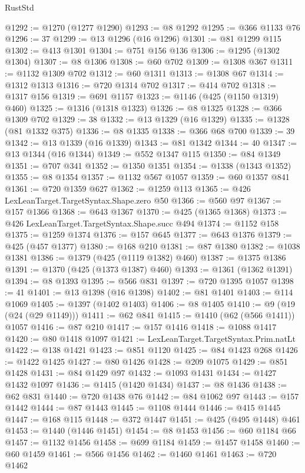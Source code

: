 \begin{lexlean}{RustStd}
\begin{coremodule}
{\begin{coremodule}
{{{{{{{{{{{{{{{{{{{{{{{{{{{{{{{{{{{{{{{{{{{{{{{{{{{{{{@1292 := @1270 (@1277 @1290)
@1293 := @8 @1292
@1295 := @366 @1133 @76
@1296 := 37
@1299 := @13 @1296 (@16 @1296)
@1301 := @81 @1299 @115
@1302 := @413 @1301
@1304 := @751 @156 @136
@1306 := @1295 (@1302 @1304)
@1307 := @8 @1306
@1308 := @60 @702
@1309 := @1308 @367
@1311 := @1132 @1309 @702
@1312 := @60 @1311
@1313 := @1308 @67
@1314 := @1312 @1313
@1316 := @720 @1314 @702
@1317 := @414 @702
@1318 := @1317 @156
@1319 := @691 @1157
@1323 := @1146 (@425 (@1150 @1319) @460)
@1325 := @1316 (@1318 @1323)
@1326 := @8 @1325
@1328 := @366 @1309 @702
@1329 := 38
@1332 := @13 @1329 (@16 @1329)
@1335 := @1328 (@81 @1332 @375)
@1336 := @8 @1335
@1338 := @366 @68 @700
@1339 := 39
@1342 := @13 @1339 (@16 @1339)
@1343 := @81 @1342
@1344 := 40
@1347 := @13 @1344 (@16 @1344)
@1349 := @552 @1347 @115
@1350 := @84 @1349
@1351 := @707 @341
@1352 := @1350 @1351
@1354 := @1338 (@1343 @1352)
@1355 := @8 @1354
@1357 := @1132 @567 @1057
@1359 := @60 @1357 @841
@1361 := @720 @1359 @627
@1362 := @1259 @113
@1365 := @426 LexLeanTarget.TargetSyntax.Shape.zero @50
@1366 := @560 @97
@1367 := @157 @1366
@1368 := @643 @1367
@1370 := @425 (@1365 @1368)
@1373 := @426 LexLeanTarget.TargetSyntax.Shape.succ @494
@1374 := @1152 @158
@1375 := @1259 @1374
@1376 := @157 @645
@1377 := @643 @1376
@1379 := @425 (@457 @1377)
@1380 := @168 @210
@1381 := @87 @1380
@1382 := @1038 @1381
@1386 := @1379 (@425 (@1119 @1382) @460)
@1387 := @1375 @1386
@1391 := @1370 (@425 (@1373 @1387) @460)
@1393 := @1361 (@1362 @1391)
@1394 := @8 @1393
@1395 := @566 @831
@1397 := @720 @1395 @1057
@1398 := 41
@1401 := @13 @1398 (@16 @1398)
@1402 := @81 @1401
@1403 := @114 @1069
@1405 := @1397 (@1402 @1403)
@1406 := @8 @1405
@1410 := @9 (@19 (@24 (@29 @1149)))
@1411 := @62 @841
@1415 := @1410 (@62 (@566 @1411)) @1057
@1416 := @87 @210
@1417 := @157 @1416
@1418 := @1088 @1417
@1420 := @80 @1418 @1097
@1421 := LexLeanTarget.TargetSyntax.Prim.natLt
@1422 := @138 @1421
@1423 := @851 @1120
@1425 := @84 @1423 @268
@1426 := @1422 @1425
@1427 := @80 @1426
@1428 := @209 @1075
@1429 := @851 @1428
@1431 := @84 @1429 @97
@1432 := @1093 @1431
@1434 := @1427 @1432 @1097
@1436 := @1415 (@1420 @1434)
@1437 := @8 @1436
@1438 := @62 @831
@1440 := @720 @1438 @76
@1442 := @84 @1062 @97
@1443 := @157 @1442
@1444 := @87 @1443
@1445 := @1108 @1444
@1446 := @415 @1445
@1447 := @168 @115
@1448 := @372 @1447
@1451 := @425 (@495 @1448) @461
@1453 := @1440 (@1446 @1451)
@1454 := @8 @1453
@1456 := @60 @1184 @66
@1457 := @1132 @1456
@1458 := @699 @1184
@1459 := @1457 @1458
@1460 := @60 @1459
@1461 := @566 @1456
@1462 := @1460 @1461
@1463 := @720 @1462
}}}}}}}}}}}}}}}}}}}}}}}}}}}}}}}}}}}}}}}}}}}}}}}}}}}}}}
\end{coremodule}}
\end{coremodule}
\end{lexlean}
